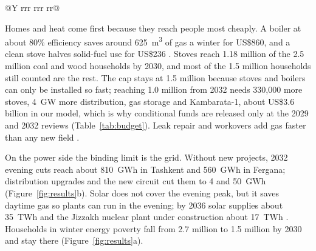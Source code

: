 \documentclass[11pt,letterpaper]{article}
\begin{document}
\begin{table}[!t]
\begin{tabularx}{\textwidth}{@{}Y rrr rrr rr@{}}
\bottomrule
\end{tabularx}
\par{}
\end{table}

Homes and heat come first because they reach people most cheaply. A boiler at about 80\% efficiency saves around 625~m\textsuperscript{3} of gas a winter for US\$860, and a clean stove halves solid-fuel use for US\$236 \cite{esmap-kg}. Stoves reach 1.18 million of the 2.5 million coal and wood households by 2030, and most of the 1.5 million households still counted are the rest. The cap stays at 1.5 million because stoves and boilers can only be installed so fast; reaching 1.0 million from 2032 needs 330,000 more stoves, 4~GW more distribution, gas storage and Kambarata-1, about US\$3.6 billion in our model, which is why conditional funds are released only at the 2029 and 2032 reviews (Table~\ref{tab:budget}). Leak repair and workovers add gas faster than any new field \cite{wb-gasnet}.

On the power side the binding limit is the grid. Without new projects, 2032 evening cuts reach about 810~GWh in Tashkent and 560~GWh in Fergana; distribution upgrades and the new circuit cut them to 4 and 50~GWh (Figure~\ref{fig:results}b). Solar does not cover the evening peak, but it saves daytime gas so plants can run in the evening; by 2036 solar supplies about 35~TWh and the Jizzakh nuclear plant under construction about 17~TWh \cite{wnn-nuclear}. Households in winter energy poverty fall from 2.7 million to 1.5 million by 2030 and stay there (Figure~\ref{fig:results}a).
\end{document}
